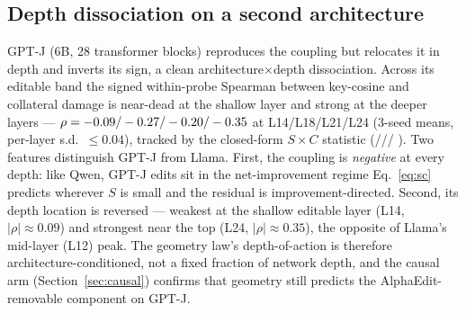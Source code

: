 \subsection{Depth dissociation on a second architecture}
\label{sec:gptjdepth}
GPT-J (6B, 28 transformer blocks) reproduces the coupling but relocates it in
depth and inverts its sign, a clean architecture$\times$depth dissociation.
Across its editable band the signed within-probe Spearman between key-cosine
and collateral damage is near-dead at the shallow layer and strong at the
deeper layers --- $\rho=\gptjRhoLfourteen{}/\gptjRhoLeighteen{}/%
\gptjRhoLtwentyone{}/\gptjRhoLtwentyfour{}$ at L14/L18/L21/L24 (3-seed means,
per-layer s.d.\ $\le 0.04$), tracked by the closed-form $S\!\times\!C$
statistic (\gptjScLfourteen{}/\gptjScLeighteen{}/\gptjScLtwentyone{}/%
\gptjScLtwentyfour{}). Two features distinguish GPT-J from Llama. First, the
coupling is \emph{negative} at every depth: like Qwen, GPT-J edits sit in the
net-improvement regime Eq.~\ref{eq:sc} predicts wherever $S$ is small and the
residual is improvement-directed. Second, its depth location is reversed ---
weakest at the shallow editable layer (L14, $|\rho|\approx 0.09$) and strongest
near the top (L24, $|\rho|\approx 0.35$), the opposite of Llama's mid-layer
(L12) peak. The geometry law's depth-of-action is therefore
architecture-conditioned, not a fixed fraction of network depth, and the causal
arm (Section~\ref{sec:causal}) confirms that geometry still predicts the
AlphaEdit-removable component on GPT-J.


